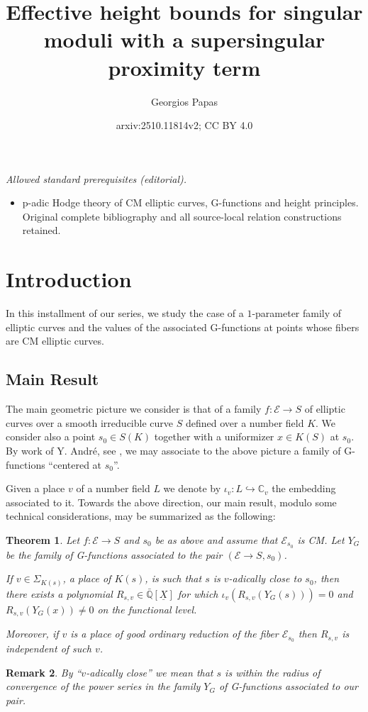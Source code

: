 \documentclass[12pt,twoside,a4paper]{article}
\title{Effective height bounds for singular moduli with a supersingular proximity term}
\author{Georgios Papas}
\date{arxiv:2510.11814v2; CC BY 4.0}
\theoremstyle{plain}%
\newtheorem{theorem}{Theorem}[section] %
\newtheorem{remark}[theorem]{Remark}
\newcommand{\C}{\mathbb{C}}
\newcommand{\Q}{\mathbb{Q}}
\newcommand{\CE}{\mathcal{E}}
\begin{document}
\maketitle
\noindent\textit{Allowed standard prerequisites (editorial).}\begin{itemize}
\item p-adic Hodge theory of CM elliptic curves, G-functions and height principles. Original complete bibliography and all source-local relation constructions retained.
\end{itemize}\medskip
\section{Introduction}
In this installment of our series, we study the case of a $1$-parameter family of elliptic curves and the values of the associated G-functions at points whose fibers are CM elliptic curves. 
 
\subsection{Main Result}

The main geometric picture we consider is that of a family $f:\CE\rightarrow S$ of elliptic curves over a smooth irreducible curve $S$ defined over a number field $K$. We consider also a point $s_0\in S(K)$ together with a uniformizer $x\in K(S)$ at $s_0$. By work of Y. Andr\'e, see \cite{andre1989g}, we may associate to the above picture a family of G-functions ``centered at $s_0$''.

Given a place $v$ of a number field $L$ we denote by $\iota_v:L\hookrightarrow \C_v$ the embedding associated to it. Towards the above direction, our main result, modulo some technical considerations, may be summarized as the following:
\begin{theorem}\label{naiverelations}
	Let $f:\CE\rightarrow S$ and $s_0$ be as above and assume that $\CE_{s_0}$ is CM. Let $Y_G$ be the family of G-functions associated to the pair $(\CE\rightarrow S,s_0)$. 
	
	If $v\in \Sigma_{K(s)}$, a place of $K(s)$, is such that $s$ is $v$-adically close to $s_0$, then there exists a polynomial $R_{s,v}\in\bar{\Q}[\underline{X}]$ for which $\iota_v(R_{s,v}(Y_G(s)))=0$ and $R_{s,v}(Y_G(x))\neq0$ on the functional level. 
	
	Moreover, if $v$ is a place of good ordinary reduction of the fiber $\CE_{s_0}$ then $R_{s,v}$ is independent of such $v$.
\end{theorem}
\begin{remark} By ``$v$-adically close'' we mean that $s$ is within the radius of convergence of the power series in the family $Y_G$ of G-functions associated to our pair. 
	
\end{remark}
\end{document}
